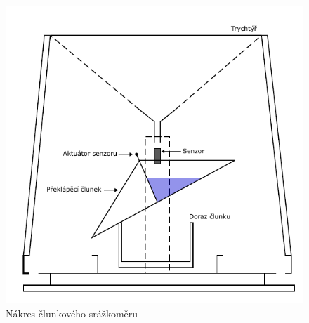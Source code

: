     \begin{figure}[!h]
      \begin{center}
        \includegraphics[scale=1]{obrazky/prace/tipping_bucket.pdf}
      \end{center}
      \caption[Člunkový srážkoměr]{Nákres člunkového srážkoměru \cite{Lewlomphaisarl}}
      \label{obr:tipping_bucket}
    \end{figure}

